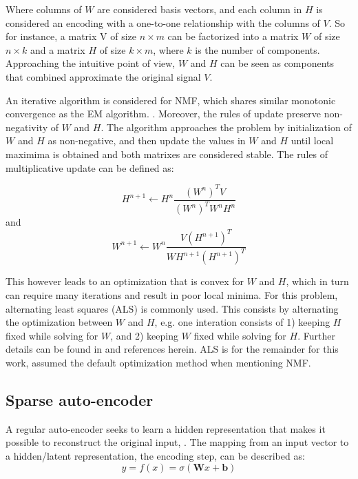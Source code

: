 \documentclass{article}
\begin{document}
Where columns of $W$ are considered basis vectors, and each column in $H$ is considered an encoding with a one-to-one relationship with the columns of $V$. So for instance, a matrix V of size $n \times m$ can be factorized into a matrix $W$ of size $n \times k$ and a matrix $H$ of size $k \times m$, where $k$ is the number of components. Approaching the intuitive point of view, $W$ and $H$ can be seen as components that combined approximate the original signal $V$.

An iterative algorithm is considered for NMF, which shares similar monotonic convergence as the EM algorithm. \cite{Dempster1977}. Moreover, the rules of update preserve non-negativity of $W$ and $H$. The algorithm approaches the problem by initialization of $W$ and $H$ as non-negative, and then update the values in $W$ and $H$ until local maximima is obtained and both matrixes are considered stable. The rules of multiplicative update can be defined as:

\begin{equation}
H^{n+1} \leftarrow H^{n} \frac{(W^n)^TV}{(W^n)^TW^nH^n}
\end{equation}
and 
\begin{equation}
W^{n+1} \leftarrow W^{n} \frac{V(H^{n+1})^T}{WH^{n+1}(H^{n+1})^T}
\end{equation}

This however leads to an optimization that is convex for $W$ and $H$, which in turn can require many iterations and result in poor local minima. For this problem, alternating least squares (ALS) is commonly used. This consists by alternating the optimization between $W$ and $H$, e.g. one interation consists of 1) keeping $H$ fixed while solving for $W$, and 2) keeping $W$ fixed while solving for $H$. Further details can be found in  \cite{Langville2014} and references herein. ALS is for the remainder for this work, assumed the default optimization method when mentioning NMF.

\subsection{Sparse auto-encoder}
A regular auto-encoder seeks to learn a hidden representation that makes it possible to reconstruct the original input, \cite{Vincent}. The mapping from an input vector to a hidden/latent representation, the encoding step, can be described as:
\begin{equation}
y = f(x) = \sigma(\mathbf{W}x + \mathbf{b})
\end{equation}
\end{document}
